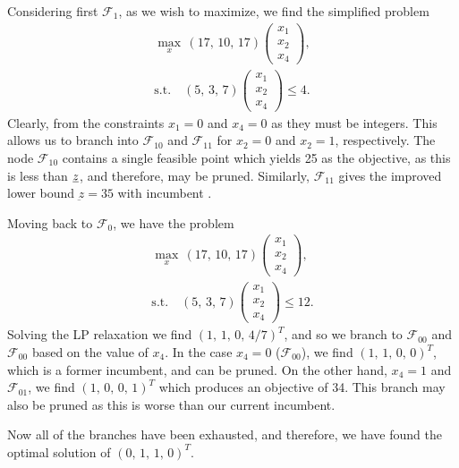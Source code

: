 \documentclass[11pt,a4paper]{article}
\begin{document}
\begin{enumerate}[i)]
    Considering first $\mathcal{F}_1$, as we wish to maximize, we find the simplified problem
    \begin{gather*}
        \max_x \, (17, \, 10, \, 17)
        \begin{pmatrix}
            x_1 \\
            x_2 \\
            x_4
        \end{pmatrix}, \\
        \text{s.t.} \quad (5, \, 3, \, 7)
        \begin{pmatrix}
            x_1 \\
            x_2 \\
            x_4
        \end{pmatrix}
        \leq 4.
    \end{gather*}
    Clearly, from the constraints $x_1 = 0$ and $x_4 = 0$ as they must be integers. This allows us to branch into $\mathcal{F}_{10}$ and $\mathcal{F}_{11}$ for $x_2 = 0$ and $x_2 = 1$, respectively. The node $\mathcal{F}_{10}$ contains a single feasible point which yields 25 as the objective, as this is less than $\underbar{$z$}$, and therefore, may be pruned. Similarly, $\mathcal{F}_{11}$ gives the improved lower bound $\underbar{z} = 35$ with incumbent .

    Moving back to $\mathcal{F}_{0}$, we have the problem
    \begin{gather*}
        \max_x \, (17, \, 10, \, 17)
        \begin{pmatrix}
            x_1 \\
            x_2 \\
            x_4
        \end{pmatrix}, \\
        \text{s.t.} \quad (5, \, 3, \, 7)
        \begin{pmatrix}
            x_1 \\
            x_2 \\
            x_4
        \end{pmatrix}
        \leq 12.
    \end{gather*}
    Solving the LP relaxation we find $(1, \, 1, \, 0, \, 4/7)^T$, and so we branch to $\mathcal{F}_{00}$ and $\mathcal{F}_{00}$ based on the value of $x_4$. In the case $x_4 = 0$ ($\mathcal{F}_{00}$), we find $(1, \, 1, \, 0, \, 0)^T$, which is a former incumbent, and can be pruned. On the other hand, $x_4 = 1$ and $\mathcal{F}_{01}$, we find $(1, \, 0, \, 0, \, 1)^T$ which produces an objective of 34. This branch may also be pruned as this is worse than our current incumbent.

    Now all of the branches have been exhausted, and therefore, we have found the optimal solution of $(0, \, 1, \, 1, \, 0)^T$.
\end{enumerate}
\end{document}
